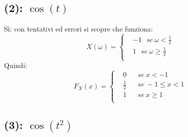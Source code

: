 \documentclass{article}
\begin{document}
\subsection{(2): $\cos(t)$}
Sì: con tentativi ed errori si scopre che funziona:
\[X(\omega ) = \left\{\begin{aligned}
&-1\ \ \ se\ \omega <\frac{1}{2}\\
& 1\ \ \ se\ \omega \geq \frac{1}{2}\\
\end{aligned}\right.\]
Quindi:
\[F_X(x) = \left\{\begin{aligned}
&0 && se\ x<-1\\
& \frac{1}{2} && se\ -1\leq x<1\\
& 1 & & se\ x\geq 1\\
\end{aligned}\right.\]

\subsection{(3): $\cos(t^2)$}
\end{document}
